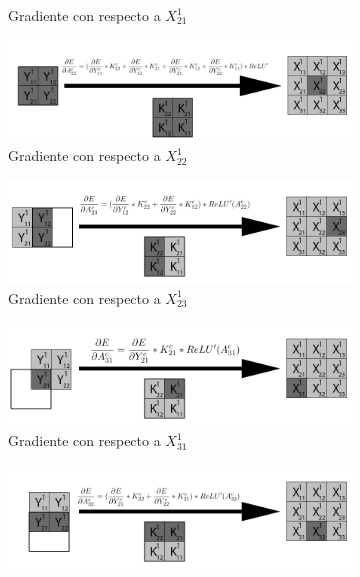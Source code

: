 \begin{figure}[H]
\begin{subfigure}{.5\textwidth}
		\caption{Gradiente con respecto a $X^1_{21}$}
	\end{subfigure}
	\vspace{5mm}
	\begin{subfigure}{.5\textwidth}
		\hspace{-25mm}
		\includegraphics[width=1.4\linewidth]{imagenes/conv_back_entrada_5.jpg}  
		\caption{Gradiente con respecto a $X^1_{22}$}
	\end{subfigure}%
	\begin{subfigure}{.5\textwidth}
		\hspace{5mm}
		\includegraphics[width=1.4\linewidth]{imagenes/conv_back_entrada_6.jpg}  
		\caption{Gradiente con respecto a $X^1_{23}$}
	\end{subfigure}
	\vspace{5mm}
	\begin{subfigure}{.5\textwidth}
		\hspace{-25mm}
		\includegraphics[width=1.4\linewidth]{imagenes/conv_back_entrada_7.jpg}  
		\caption{Gradiente con respecto a $X^1_{31}$}
	\end{subfigure}%
	\begin{subfigure}{.5\textwidth}
		\hspace{5mm}
		\includegraphics[width=1.4\linewidth]{imagenes/conv_back_entrada_8.jpg}  

\end{subfigure}
\end{figure}
